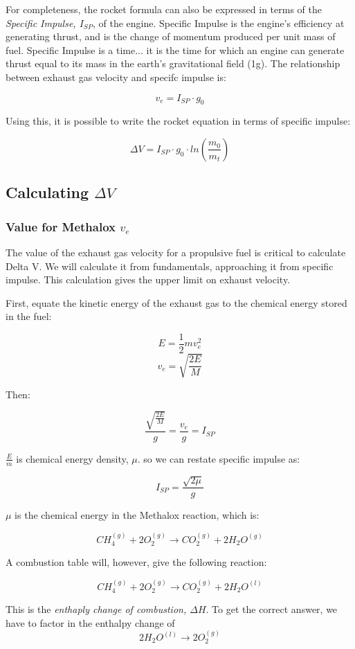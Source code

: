 \documentclass[11pt]{article}
\begin{document}
For completeness, the rocket formula can also be expressed in terms of the \emph{Specific Impulse, $I_{SP}$}, of the engine. Specific Impulse is the engine's efficiency at generating thrust, and is the change of momentum produced per unit mass of fuel. Specific Impulse is a time... it is the time for which an engine can generate thrust equal to its mass in the earth's gravitational field (1g). The relationship between exhaust gas velocity and specifc impulse is:

\[v_e=I_{SP} \cdot g_0\]

Using this, it is possible to write the rocket equation in terms of specific impulse:

\[\Delta V = I_{SP} \cdot g_0 \cdot ln \left( \frac{m_0}{m_t} \right)\]

\subsection{Calculating \(\Delta V \)}
\subsubsection{Value for Methalox $v_e$}

The value of the exhaust gas velocity for a propulsive fuel is critical to calculate Delta V. We will calculate it from fundamentals, approaching it from specific impulse. This calculation gives the upper limit on exhaust velocity.

First, equate the kinetic energy of the exhaust gas to the chemical energy stored in the fuel:

\[E=\frac{1}{2} mv_e^2\]
\[v_e = \sqrt{\frac{2E}{M}}\]

Then:

\[\frac{\sqrt{\frac{2E}{M}}}{g}=\frac{v_e}{g}=I_{SP}\]

$\frac{E}{m}$ is chemical energy density, $\mu$. so we can restate specific impulse as:

\[I_{SP}=\frac{\sqrt{2 \mu}}{g}\] 

$\mu$ is the chemical energy in the Methalox reaction, which is:

\[CH_4^{(g)}+2O_2^{(g)} \rightarrow CO_2^{(g)}+2H_2O^{(g)}\]

A combustion table will, however, give the following reaction:

\[CH_4^{(g)}+2O_2^{(g)} \rightarrow CO_2^{(g)}+2H_2O^{(l)}\]

This is the \emph{enthaply change of combustion, $\Delta H$}. To get the correct answer, we have to factor in the  enthalpy change of
\[2H_2O^{(l)} \rightarrow 2O_2^{(g)}\]
\end{document}
